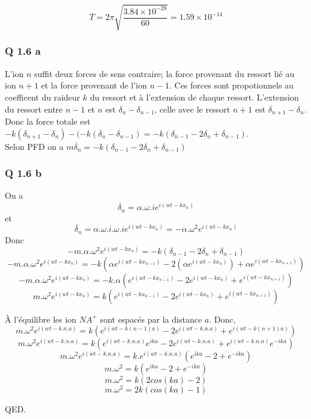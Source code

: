 \documentclass[]{book}
\theoremstyle{definition}
\begin{document}
$$T = 2\pi \sqrt{\frac{3.84\times10^{-28}}{60}} = 1.59\times10^{-14}$$

\subsubsection*{Q 1.6 a}
L'ion $n$ suffit deux forces de sens contraire; la force provenant du ressort li\'e au ion $n+1$ et la force provenant de l'ion $n-1$. Ces forces sont propotionnels au coefficent du raideur $k$ du ressort et \`a l'extension de chaque ressort. L'extension du ressort entre $n-1$ et $n$ est $\delta_{n} - \delta_{n-1}$, celle avec le ressort $n+1$ est $\delta_{n+1} - \delta_{n}$. Donc la force totale est $-k(\delta_{n+1} - \delta_{n}) - (-k(\delta_{n} - \delta_{n-1}) = -k(\delta_{n-1} -2\delta_{n} + \delta_{n-1})$.\\ 

Selon PFD on a $m\ddot{\delta_{n}} = -k(\delta_{n-1} -2\delta_{n} + \delta_{n-1})$


\subsubsection*{Q 1.6 b}
On a $$\dot{\delta_{n}} = \alpha.\omega.i e^{i(wt-kx_n)}$$
et $$\ddot{\delta_{n}} = \alpha.\omega.i.\omega.i e^{i(wt-kx_n)} = -\alpha.\omega^2 e^{i(wt-kx_n)}$$
Donc
$$-m.\alpha.\omega^2 e^{i(wt-kx_n)} = -k(\delta_{n-1} -2\delta_{n} + \delta_{n-1})$$
$$-m.\alpha.\omega^2 e^{i(wt-kx_n)} = -k(\alpha e^{i(wt-kx_{n-1})} -2(\alpha e^{i(wt-kx_n)}) + \alpha e^{i(wt-kx_{n+1})})$$
$$-m.\alpha.\omega^2 e^{i(wt-kx_n)} = -k.\alpha( e^{i(wt-kx_{n-1})} -2e^{i(wt-kx_n)} + e^{i(wt-kx_{n+1})})$$
$$m.\omega^2 e^{i(wt-kx_n)} = k( e^{i(wt-kx_{n-1})} -2e^{i(wt-kx_n)} + e^{i(wt-kx_{n+1})})$$

\`A l'\'equilibre les ion $NA^{+}$ sont espac\'es par la distance $a$. Donc,
$$m.\omega^2 e^{i(wt-k.n.a)} = k( e^{i(wt-k(n-1)a)} -2e^{i(wt-k.n.a)} + e^{i(wt-k(n+1)a)})$$
$$m.\omega^2 e^{i(wt-k.n.a)} = k( e^{i(wt-k.n.a)}e^{ika} - 2e^{i(wt-k.n.a)} + e^{i(wt-k.n.a)}e^{-ika})$$
$$m.\omega^2 e^{i(wt-k.n.a)} = k.e^{i(wt-k.n.a)}( e^{ika} - 2 + e^{-ika})$$
$$m.\omega^2 = k( e^{ika} - 2 + e^{-ika})$$
$$m.\omega^2 = k( 2cos(ka) - 2 )$$
$$m.\omega^2 = 2k( cos(ka) - 1 )$$



QED.
\end{document}
